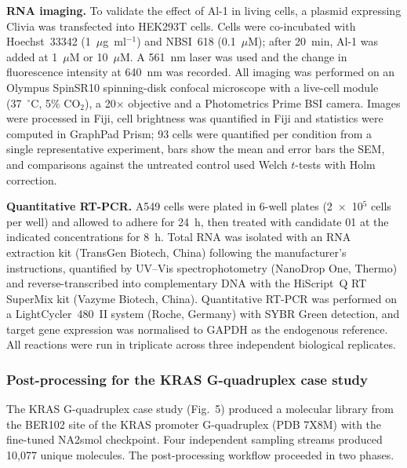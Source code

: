 \documentclass[pdflatex,sn-mathphys-num]{sn-jnl}
\theoremstyle{thmstyleone}
\theoremstyle{thmstyletwo}
\theoremstyle{thmstylethree}
\begin{document}
\textbf{RNA imaging.} To validate the effect of Al-1 in living cells, a plasmid expressing Clivia was transfected into HEK293T cells. Cells were co-incubated with Hoechst~33342 (1~$\mu$g~ml$^{-1}$) and NBSI~618 (0.1~$\mu$M); after 20~min, Al-1 was added at 1~$\mu$M or 10~$\mu$M. A 561~nm laser was used and the change in fluorescence intensity at 640~nm was recorded. All imaging was performed on an Olympus SpinSR10 spinning-disk confocal microscope with a live-cell module (37~$^\circ$C, 5\% CO$_2$), a 20$\times$ objective and a Photometrics Prime BSI camera. Images were processed in Fiji, cell brightness was quantified in Fiji and statistics were computed in GraphPad Prism; 93 cells were quantified per condition from a single representative experiment, bars show the mean and error bars the SEM, and comparisons against the untreated control used Welch $t$-tests with Holm correction.

\textbf{Quantitative RT-PCR.} A549 cells were plated in 6-well plates (2~$\times$~10$^{5}$ cells per well) and allowed to adhere for 24~h, then treated with candidate 01 at the indicated concentrations for 8~h. Total RNA was isolated with an RNA extraction kit (TransGen Biotech, China) following the manufacturer's instructions, quantified by UV--Vis spectrophotometry (NanoDrop One, Thermo) and reverse-transcribed into complementary DNA with the HiScript~Q RT SuperMix kit (Vazyme Biotech, China). Quantitative RT-PCR was performed on a LightCycler~480~II system (Roche, Germany) with SYBR Green detection, and target gene expression was normalised to GAPDH as the endogenous reference. All reactions were run in triplicate across three independent biological replicates.

\subsubsection{Post-processing for the KRAS G-quadruplex case study}

The KRAS G-quadruplex case study (Fig.~5) produced a molecular library from the BER102 site of the KRAS promoter G-quadruplex (PDB 7X8M) with the fine-tuned NA2smol checkpoint. Four independent sampling streams produced 10,077 unique molecules. The post-processing workflow proceeded in two phases.
\end{document}
